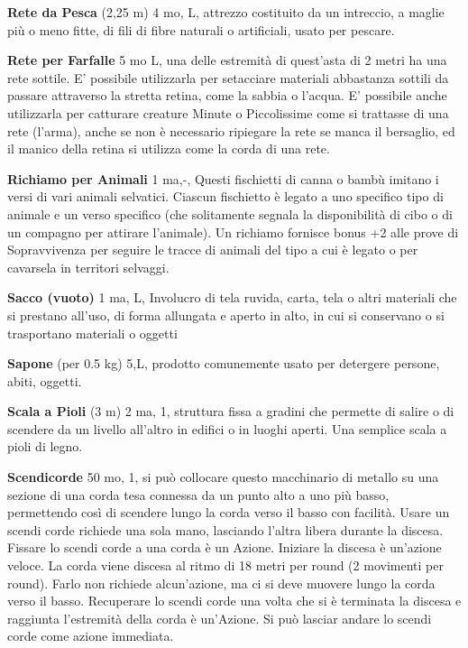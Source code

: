 \documentclass[a4paper,11pt,twoside,openany]{book}
\begin{document}
\textbf{Rete da Pesca} (2,25 m) 4 mo, L, attrezzo costituito da un intreccio, a maglie più o meno fitte, di fili di fibre naturali o artificiali, usato per pescare.

\textbf{Rete per Farfalle} 5 mo L, una delle estremità di quest'asta di 2 metri ha una rete sottile. E' possibile utilizzarla per setacciare materiali abbastanza sottili da passare attraverso la stretta retina, come la sabbia o l'acqua. E' possibile anche utilizzarla per catturare creature Minute o Piccolissime come si trattasse di una rete (l'arma), anche se non è necessario ripiegare la rete se manca il bersaglio, ed il manico della retina si utilizza come la corda di una rete.

\textbf{Richiamo per Animali} 1 ma,-, Questi fischietti di canna o bambù imitano i versi di vari animali selvatici. Ciascun fischietto è legato a uno specifico tipo di animale e un verso specifico (che solitamente segnala la disponibilità di cibo o di un compagno per attirare l'animale). Un richiamo fornisce bonus +2 alle prove di Sopravvivenza per seguire le tracce di animali del tipo a cui è legato o per cavarsela in territori selvaggi.

\textbf{Sacco (vuoto)} 1 ma, L, Involucro di tela ruvida, carta, tela o altri materiali che si prestano all'uso, di forma allungata e aperto in alto, in cui si conservano o si trasportano materiali o oggetti

\textbf{Sapone} (per 0.5 kg) 5,L, prodotto comunemente usato per detergere persone, abiti, oggetti.

\textbf{Scala a Pioli} (3 m) 2 ma, 1, struttura fissa a gradini che permette di salire o di scendere da un livello all'altro in edifici o in luoghi aperti. Una semplice scala a pioli di legno.

\textbf{Scendicorde} 50 mo, 1, si può collocare questo macchinario di metallo su una sezione di una corda tesa connessa da un punto alto a uno più basso, permettendo così di scendere lungo la corda verso il basso con facilità. Usare un scendi corde richiede una sola mano, lasciando l'altra libera durante la discesa. Fissare lo scendi corde a una corda è un Azione. Iniziare la discesa è un'azione veloce. La corda viene discesa al ritmo di 18 metri per round (2 movimenti per round). Farlo non richiede alcun'azione, ma ci si deve muovere lungo la corda verso il basso. Recuperare lo scendi corde una volta che si è terminata la discesa e raggiunta l'estremità della corda è un'Azione.
Si può lasciar andare lo scendi corde come azione immediata.
\end{document}
